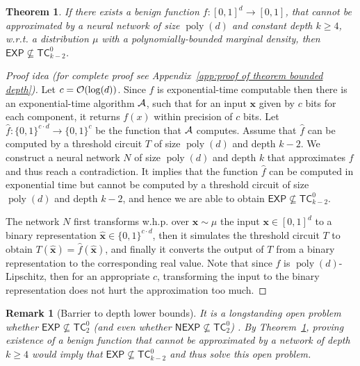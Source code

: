 \documentclass[11pt]{article}
\newtheorem{theorem}{Theorem}[section]
\newtheorem{remark}{Remark}[section]
\newcommand{\bx}{\mathbf{x}}
\newcommand{\co}{{\cal O}}
\newcommand{\ca}{{\cal A}}
\DeclareMathOperator{\poly}{poly}
\newcommand{\hbx}{{\hat{\bx}}}
\newcommand{\TC}{\textsf{TC}}
\newcommand{\EXP}{\textsf{EXP}}
\newcommand{\NEXP}{\textsf{NEXP}}
\begin{document}
\begin{theorem}
\label{thm:bounded depth}
	If there exists a benign function $f:[0,1]^d \rightarrow [0,1]$, that cannot be approximated by a neural network of size $\poly(d)$ and constant depth $k \geq 4$, w.r.t. a distribution $\mu$ with a polynomially-bounded marginal density, then $\EXP \not \subseteq \TC^0_{k-2}$. 
\end{theorem}
\begin{proof}[Proof idea (for complete proof see Appendix~\ref{app:proof of theorem bounded depth})]
	Let $c=\co(\log(d))$. Since $f$ is exponential-time computable then there is an exponential-time algorithm $\ca$, such that for an input $\bx$ given by $c$ bits for each component, it returns $f(x)$ within precision of $c$ bits. Let $\hat{f}:\{0,1\}^{c \cdot d} \rightarrow \{0,1\}^c$ be the function that $\ca$ computes. Assume that $\hat{f}$ can be computed by a threshold circuit $T$ of size $\poly(d)$ and depth $k-2$. We construct a neural network $N$ of size $\poly(d)$ and depth $k$ that approximates $f$ and thus reach a contradiction. It implies that the function $\hat{f}$ can be computed in exponential time but cannot be computed by a threshold circuit of size $\poly(d)$ and depth $k-2$, and hence we are able to obtain $\EXP \not \subseteq \TC^0_{k-2}$.
	
	The network $N$ first transforms w.h.p. over $\bx \sim \mu$ the input $\bx \in [0,1]^d$ to a binary representation $\hbx \in \{0,1\}^{c \cdot d}$, then it simulates the threshold circuit $T$ to obtain $T(\hbx)=\hat{f}(\hbx)$, and finally it converts the output of $T$ from a binary representation to the corresponding real value. Note that since $f$ is $\poly(d)$-Lipschitz, then for an appropriate $c$, transforming the input to the binary representation does not hurt the approximation too much.
\end{proof}

\begin{remark}[Barrier to depth lower bounds]
	It is a longstanding open problem whether $\EXP \not \subseteq \TC^0_{2}$ (and even whether $\NEXP \not \subseteq \TC^0_{2}$)  \citep{razborov1992small,oliveira2015unconditional,chen2018toward}. 
	By Theorem~\ref{thm:bounded depth},	proving existence of a benign function that cannot be approximated by a network of depth $k \geq 4$ would imply that $\EXP \not \subseteq \TC^0_{k-2}$ and thus solve this open problem.
\end{remark}
\end{document}
